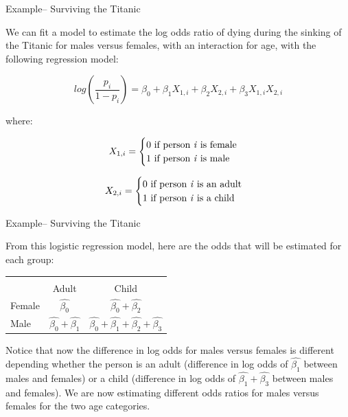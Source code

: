 \documentclass[ignorenonframetext,]{beamer}
\begin{document}
\begin{frame}{Example-- Surviving the Titanic}

We can fit a model to estimate the log odds ratio of dying during the
sinking of the Titanic for males versus females, with an interaction for
age, with the following regression model:

\[
log(\frac{p_i}{1 - p_i}) = \beta_0 + \beta_1X_{1,i} + \beta_2X_{2,i} + \beta_3X_{1,i}X_{2,i}
\]

where:

\begin{equation*}
    X_{1,i}=
    \begin{cases}
      0 \text{ if person \textit{i} is female} \\
      1 \text{ if person \textit{i} is male}
    \end{cases}
\end{equation*}

\begin{equation*}
    X_{2,i}=
    \begin{cases}
      0 \text{ if person \textit{i} is an adult} \\
      1 \text{ if person \textit{i} is a child}
    \end{cases}
\end{equation*}

\end{frame}

\begin{frame}{Example-- Surviving the Titanic}

From this logistic regression model, here are the odds that will be
estimated for each group:

\centering

\begin{tabular}{lcc}
\toprule \\
 & Adult & Child \\
\midrule
Female & $\hat{\beta_0}$ & $\hat{\beta_0} + \hat{\beta_2}$ \\
Male & $\hat{\beta_0} + \hat{\beta_1}$ & $\hat{\beta_0} + \hat{\beta_1} + \hat{\beta_2} + \hat{\beta_3}$ \\
\bottomrule
\end{tabular}

\vspace{5mm}

\justifying

Notice that now the difference in log odds for males versus females is
different depending whether the person is an adult (difference in log
odds of \(\hat{\beta_1}\) between males and females) or a child
(difference in log odds of \(\hat{\beta_1} + \hat{\beta_3}\) between
males and females). We are now estimating different odds ratios for
males versus females for the two age categories.

\end{frame}
\end{document}
